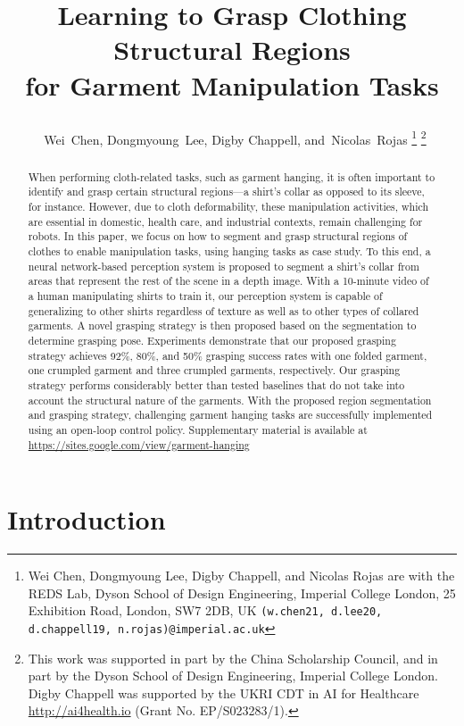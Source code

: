 \documentclass[letterpaper, 10 pt, conference]{ieeeconf}  %
\title{\LARGE \bf



Learning to Grasp Clothing Structural Regions\\ for Garment Manipulation Tasks
}
\author{~Wei~Chen, Dongmyoung~Lee, Digby Chappell,
        and~Nicolas~Rojas
\thanks{Wei Chen, Dongmyoung Lee, Digby Chappell,
        and Nicolas Rojas are with the REDS Lab, Dyson School of Design Engineering, Imperial College London, 25 Exhibition Road, London, SW7 2DB, UK
{\tt\small (w.chen21, d.lee20, d.chappell19, n.rojas)@imperial.ac.uk}}%
\thanks{This work was supported in part by the China Scholarship Council, and in part by the Dyson School of Design Engineering, Imperial College London. Digby Chappell was supported by the UKRI CDT in AI for Healthcare \protect\url{http://ai4health.io} (Grant No. EP/S023283/1).}
}
\begin{document}
\maketitle

\thispagestyle{empty}
\pagestyle{empty}



\begin{abstract}
When performing cloth-related tasks, such as garment hanging, it is often important to identify and grasp certain structural regions---a shirt's collar as opposed to its sleeve, for instance. However, due to cloth deformability, these manipulation activities, which are essential in domestic, health care, and industrial contexts, remain challenging for robots. In this paper, we focus on how to segment and grasp structural regions of clothes to enable manipulation tasks, using hanging tasks as case study. To this end, a neural network-based perception system is proposed to segment a shirt's collar from areas that represent the rest of the scene in a depth image.
With a 10-minute video of a human manipulating shirts to train it, our perception system is capable of generalizing to other shirts regardless of texture as well as to other types of collared garments. A novel grasping strategy is then proposed based on the segmentation to determine grasping pose. Experiments demonstrate that our proposed grasping strategy achieves 92\%, 80\%, and 50\% grasping success rates with one folded garment, one crumpled garment and three crumpled garments, respectively. 
Our grasping strategy performs considerably better than tested baselines that do not take into account the structural nature of the garments.
With the proposed region segmentation and grasping strategy, challenging garment hanging tasks are successfully implemented using an open-loop control policy. Supplementary material is available at \href{https://sites.google.com/view/garment-hanging}{https://sites.google.com/view/garment-hanging}

\end{abstract}


\section{Introduction}
\end{document}
